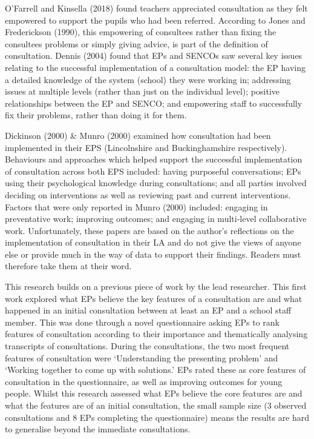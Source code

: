 \documentclass[
  english,
  man]{apa}
\begin{document}
O'Farrell and Kinsella (2018) found teachers appreciated consultation as they felt empowered to support the pupils who had been referred. According to Jones and Frederickson (1990), this empowering of consultees rather than fixing the consultees problems or simply giving advice, is part of the definition of consultation. Dennis (2004) found that EPs and SENCOs saw several key issues relating to the successful implementation of a consultation model: the EP having a detailed knowledge of the system (school) they were working in; addressing issues at multiple levels (rather than just on the individual level); positive relationships between the EP and SENCO; and empowering staff to successfully fix their problems, rather than doing it for them.

Dickinson (2000) \& Munro (2000) examined how consultation had been implemented in their EPS (Lincolnshire and Buckinghamshire respectively). Behaviours and approaches which helped support the successful implementation of consultation across both EPS included: having purposeful conversations; EPs using their psychological knowledge during consultations; and all parties involved deciding on interventions as well as reviewing past and current interventions. Factors that were only reported in Munro (2000) included: engaging in preventative work; improving outcomes; and engaging in multi-level collaborative work. Unfortunately, these papers are based on the author's reflections on the implementation of consultation in their LA and do not give the views of anyone else or provide much in the way of data to support their findings. Readers must therefore take them at their word.

This research builds on a previous piece of work by the lead researcher. This first work explored what EPs believe the key features of a consultation are and what happened in an initial consultation between at least an EP and a school staff member. This was done through a novel questionnaire asking EPs to rank features of consultation according to their importance and thematically analysing transcripts of consultations. During the consultations, the two most frequent features of consultation were `Understanding the presenting problem' and `Working together to come up with solutions.' EPs rated these as core features of consultation in the questionnaire, as well as improving outcomes for young people. Whilst this research assessed what EPs believe the core features are and what the features are of an initial consultation, the small sample size (3 observed consultations and 8 EPs completing the questionnaire) means the results are hard to generalise beyond the immediate consultations.
\end{document}
